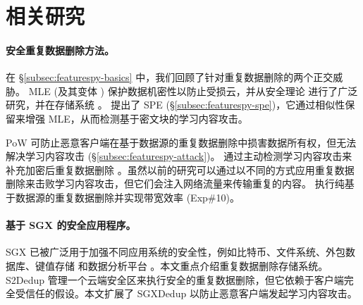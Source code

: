 \section{相关研究}
\label{sec:featurespy-related-work}

\paragraph*{安全重复数据删除方法。}
在 \S\ref{subsec:featurespy-basics} 中，我们回顾了针对重复数据删除的两个正交威胁。 MLE (及其变体 \cite{bellare13a, bellare13b, douceur02, li15}) 保护数据机密性以防止受损云，并从安全理论 \cite{bellare15, abadi13} 进行了广泛研究，并在存储系统 \cite{cox02, adya02, bellare13b, armknecht15, shah15, li15, li19, qin17, li20a, ren21}。 \sysnameF 提出了 SPE (\S\ref{subsec:featurespy-spe})，它通过相似性保留来增强 MLE，从而检测基于密文块的学习内容攻击。


PoW 可防止恶意客户端在基于数据源的重复数据删除中损害数据所有权，但无法解决学习内容攻击 (\S\ref{subsec:featurespy-attack})。 \sysnameF 通过主动检测学习内容攻击来补充加密后重复数据删除 \cite{ren21}。虽然以前的研究可以通过以不同的方式应用重复数据删除来击败学习内容攻击，但它们会注入网络流量来传输重复的内容。 \sysnameF 执行纯基于数据源的重复数据删除并实现带宽效率 (Exp\#10)。


\paragraph*{基于 SGX 的安全应用程序。}
SGX 已被广泛用于加强不同应用系统的安全性，例如比特币\cite{matetic19}、文件系统\cite{ahmad18,shinde20}、外包数据库\cite{eskandarian17,priebe18,sun21}、键值存储\cite{mishra18,bailleu19,kim19,bailleu21} 和数据分析平台 \cite{schuster15, zheng17, bowe20}。本文重点介绍重复数据删除存储系统。 S2Dedup \cite{miranda21} 管理一个云端安全区来执行安全的重复数据删除，但它依赖于客户端完全受信任的假设。本文扩展了 SGXDedup \cite{ren21} 以防止恶意客户端发起学习内容攻击。